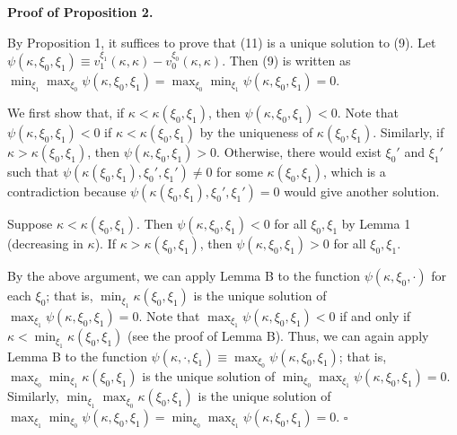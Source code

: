 \documentclass[12pt,a4paper]{article}
\newenvironment{original}
  {\par\medskip\noindent\color{black}\ignorespaces}
  {\par\medskip}
\theoremstyle{definition}
\theoremstyle{remark}
\begin{document}
\medskip
\noindent\textbf{Proof of Proposition 2.}
\begin{original}
By Proposition 1, it suffices to prove that (11) is a unique solution to (9). Let $\psi(\kappa, \xi_0, \xi_1) \equiv v_1^{\xi_1}(\kappa, \kappa) - v_0^{\xi_0}(\kappa, \kappa)$. Then (9) is written as $\min_{\xi_1} \max_{\xi_0} \psi(\kappa, \xi_0, \xi_1) = \max_{\xi_0} \min_{\xi_1} \psi(\kappa, \xi_0, \xi_1) = 0$.

We first show that, if $\kappa < \kappa(\xi_0, \xi_1)$, then $\psi(\kappa, \xi_0, \xi_1) < 0$. Note that $\psi(\kappa, \xi_0, \xi_1) < 0$ if $\kappa < \kappa(\xi_0, \xi_1)$ by the uniqueness of $\kappa(\xi_0, \xi_1)$. Similarly, if $\kappa > \kappa(\xi_0, \xi_1)$, then $\psi(\kappa, \xi_0, \xi_1) > 0$. Otherwise, there would exist $\xi_0'$ and $\xi_1'$ such that $\psi(\kappa(\xi_0, \xi_1), \xi_0', \xi_1') \ne 0$ for some $\kappa(\xi_0, \xi_1)$, which is a contradiction because $\psi(\kappa(\xi_0, \xi_1), \xi_0', \xi_1') = 0$ would give another solution.

Suppose $\kappa < \kappa(\xi_0, \xi_1)$. Then $\psi(\kappa, \xi_0, \xi_1) < 0$ for all $\xi_0, \xi_1$ by Lemma 1 (decreasing in $\kappa$). If $\kappa > \kappa(\xi_0, \xi_1)$, then $\psi(\kappa, \xi_0, \xi_1) > 0$ for all $\xi_0, \xi_1$.

By the above argument, we can apply Lemma B to the function $\psi(\kappa, \xi_0, \cdot)$ for each $\xi_0$; that is, $\min_{\xi_1} \kappa(\xi_0, \xi_1)$ is the unique solution of $\max_{\xi_1} \psi(\kappa, \xi_0, \xi_1) = 0$. Note that $\max_{\xi_1} \psi(\kappa, \xi_0, \xi_1) < 0$ if and only if $\kappa < \min_{\xi_1} \kappa(\xi_0, \xi_1)$ (see the proof of Lemma B). Thus, we can again apply Lemma B to the function $\psi(\kappa, \cdot, \xi_1) \equiv \max_{\xi_0} \psi(\kappa, \xi_0, \xi_1)$; that is, $\max_{\xi_0} \min_{\xi_1} \kappa(\xi_0, \xi_1)$ is the unique solution of $\min_{\xi_0} \max_{\xi_1} \psi(\kappa, \xi_0, \xi_1) = 0$. Similarly, $\min_{\xi_1} \max_{\xi_0} \kappa(\xi_0, \xi_1)$ is the unique solution of $\max_{\xi_1} \min_{\xi_0} \psi(\kappa, \xi_0, \xi_1) = \min_{\xi_0} \max_{\xi_1} \psi(\kappa, \xi_0, \xi_1) = 0$. $\square$
\end{original}
\end{document}
